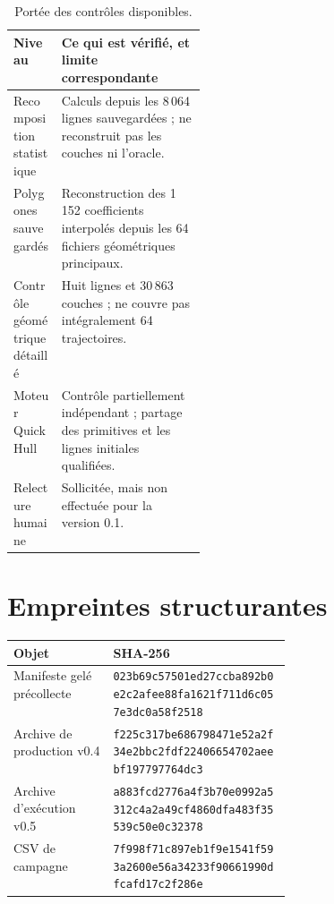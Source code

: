 \documentclass[11pt,a4paper]{article}
\newcommand{\sha}[1]{{\small\ttfamily\nolinkurl{#1}}}
\begin{document}
\begin{table}[htbp]
\centering
\caption{Portée des contrôles disponibles.}
\begin{tabularx}{\linewidth}{@{}>{\raggedright\arraybackslash}p{0.25\linewidth}X@{}}
\toprule
Niveau & Ce qui est vérifié, et limite correspondante \\
\midrule
Recomposition statistique & Calculs depuis les 8\,064 lignes sauvegardées ; ne reconstruit pas les couches ni l'oracle. \\
Polygones sauvegardés & Reconstruction des 1\,152 coefficients interpolés depuis les 64 fichiers géométriques principaux. \\
Contrôle géométrique détaillé & Huit lignes et 30\,863 couches ; ne couvre pas intégralement 64 trajectoires. \\
Moteur QuickHull & Contrôle partiellement indépendant ; partage des primitives et les lignes initiales qualifiées. \\
Relecture humaine & Sollicitée, mais non effectuée pour la version 0.1. \\
\bottomrule
\end{tabularx}
\end{table}

\section{Empreintes structurantes}

\begin{tabularx}{\linewidth}{@{}p{0.36\linewidth}X@{}}
\toprule
Objet & SHA-256 \\
\midrule
Manifeste gelé précollecte & \sha{023b69c57501ed27ccba892b0e2c2afee88fa1621f711d6c057e3dc0a58f2518} \\
Archive de production v0.4 & \sha{f225c317be686798471e52a2f34e2bbc2fdf22406654702aeebf197797764dc3} \\
Archive d'exécution v0.5 & \sha{a883fcd2776a4f3b70e0992a5312c4a2a49cf4860dfa483f35539c50e0c32378} \\
CSV de campagne & \sha{7f998f71c897eb1f9e1541f593a2600e56a34233f90661990dfcafd17c2f286e} \\
\bottomrule
\end{tabularx}
\end{document}
